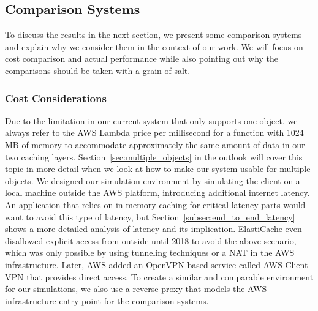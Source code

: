 \subsection{Comparison Systems}
\label{subsec:comparison_systems}
To discuss the results in the next section, we present some comparison systems and explain why we consider them in the context of our work. We will focus on cost comparison and actual performance while also pointing out why the comparisons should be taken with a grain of salt. 

\subsubsection{Cost Considerations}
Due to the limitation in our current system that only supports one object, we always refer to the AWS Lambda price per millisecond for a function with 1024 MB of memory to accommodate approximately the same amount of data in our two caching layers. Section~\ref{sec:multiple_objects} in the outlook will cover this topic in more detail when we look at how to make our system usable for multiple objects. We designed our simulation environment by simulating the client on a local machine outside the AWS platform, introducing additional internet latency. An application that relies on in-memory caching for critical latency parts would want to avoid this type of latency, but Section~\ref{subsec:end_to_end_latency} shows a more detailed analysis of latency and its implication. ElastiCache even disallowed explicit access from outside until 2018 to avoid the above scenario, which was only possible by using tunneling techniques or a NAT in the AWS infrastructure. Later, AWS added an OpenVPN-based service called AWS Client VPN that provides direct access. To create a similar and comparable environment for our simulations, we also use a reverse proxy that models the AWS infrastructure entry point for the comparison systems. 

